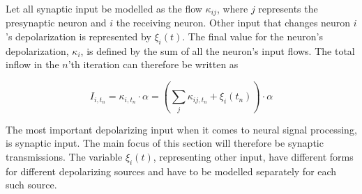 
	Let all synaptic input be modelled as the flow $\kappa_{ij}$, where $j$ represents the presynaptic neuron and $i$ the receiving neuron.
	Other input that changes neuron $i$'s depolarization is represented by $\xi_i(t)$.
	The final value for the neuron's depolarization, $\kappa_i$, is defined by the sum of all the neuron's input flows.
	The total inflow in the $n$'th iteration can therefore be written as

		\begin{equation}
			I_{i, t_n} = \kappa_{i,t_n} \cdot \alpha = \left( \sum_{j} \kappa_{ij, t_n} + \xi_i(t_n) \right) \cdot \alpha
			\label{eqSynapticIntegrationForKANN}
		\end{equation}

	The most important depolarizing input when it comes to neural signal processing, is synaptic input\cite{PrinciplesOfNeuralScience4edKAP10}.
	The main focus of this section will therefore be synaptic transmissions.
	The variable $\xi_i(t)$, representing other input, have different forms for different depolarizing sources and have to be modelled separately for each such source.

